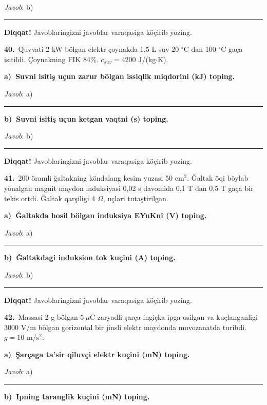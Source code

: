 \documentclass[11pt,a4paper]{article}
\newcommand{\blank}{\rule{5cm}{0.4pt}}
\begin{document}
\noindent\textit{Javob}: b)\ \blank\par
\medskip\noindent\textbf{Diqqat!} Javoblaringizni javoblar varaqasiga köçirib yozing.\par\vspace{10pt}
\noindent\textbf{40.}\ Quvvati 2 kW bölgan elektr çoynakda 1,5 L suv 20 $^\circ$C dan 100 $^\circ$C gaça isitildi. Çoynakning FIK 84\%. $c_{suv}=4200$ J/(kg$\cdot$K).\par\smallskip
\medskip\noindent\textbf{a)\ Suvni isitiş uçun zarur bölgan issiqlik miqdorini (kJ) toping.}\par
\noindent\textit{Javob}: a)\ \blank\par
\medskip\noindent\textbf{b)\ Suvni isitiş uçun ketgan vaqtni (s) toping.}\par
\noindent\textit{Javob}: b)\ \blank\par
\medskip\noindent\textbf{Diqqat!} Javoblaringizni javoblar varaqasiga köçirib yozing.\par\vspace{10pt}
\noindent\textbf{41.}\ 200 öramli ğaltakning köndalang kesim yuzasi 50 cm$^2$. Ğaltak öqi böylab yönalgan magnit maydon induksiyasi 0,02 s davomida 0,1 T dan 0,5 T gaça bir tekis ortdi. Ğaltak qarşiligi 4 $\Omega$, uçlari tutaştirilgan.\par\smallskip
\medskip\noindent\textbf{a)\ Ğaltakda hosil bölgan induksiya EYuKni (V) toping.}\par
\noindent\textit{Javob}: a)\ \blank\par
\medskip\noindent\textbf{b)\ Ğaltakdagi induksion tok kuçini (A) toping.}\par
\noindent\textit{Javob}: b)\ \blank\par
\medskip\noindent\textbf{Diqqat!} Javoblaringizni javoblar varaqasiga köçirib yozing.\par\vspace{10pt}
\noindent\textbf{42.}\ Massasi 2 g bölgan $5\ \mu$C zaryadli şarça ingiçka ipga osilgan va kuçlanganligi 3000 V/m bölgan gorizontal bir jinsli elektr maydonda muvozanatda turibdi. $g=10$ m/s$^2$.\par\smallskip
\medskip\noindent\textbf{a)\ Şarçaga ta’sir qiluvçi elektr kuçini (mN) toping.}\par
\noindent\textit{Javob}: a)\ \blank\par
\medskip\noindent\textbf{b)\ Ipning taranglik kuçini (mN) toping.}\par
\end{document}
